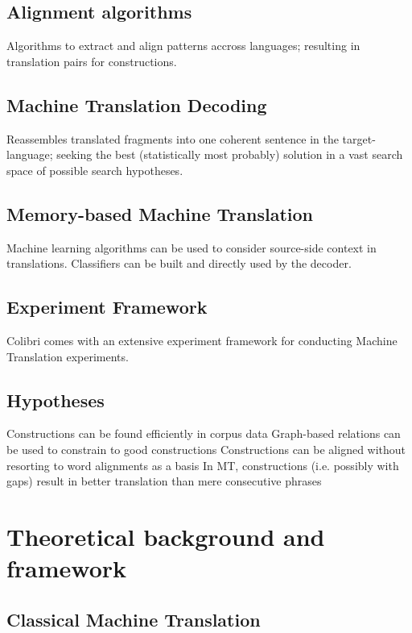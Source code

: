 \documentclass[12pt]{article}
\begin{document}
\subsection{Alignment algorithms} Algorithms to extract and align patterns accross languages; resulting in translation pairs for constructions.
\subsection{Machine Translation Decoding} Reassembles translated fragments into one coherent sentence in the target-language; seeking the best (statistically most probably) solution in a vast search space of possible search hypotheses.
\subsection{Memory-based Machine Translation} Machine learning algorithms can be used to consider source-side context in translations. Classifiers can be built and directly used by the decoder.
\subsection{Experiment Framework} Colibri comes with an extensive experiment framework for conducting Machine Translation experiments.\

\subsection{Hypotheses} %

Constructions can be found efficiently in corpus data
Graph-based relations can be used to constrain to good constructions
Constructions can be aligned without resorting to word alignments as a basis
In MT, constructions (i.e. possibly with gaps) result in better translation than mere consecutive phrases







\section{Theoretical background and framework}

\subsection{Classical Machine Translation}
\end{document}
